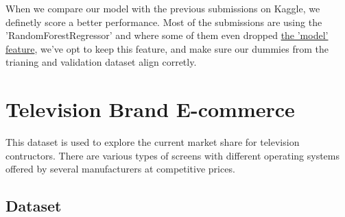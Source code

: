\newcommand{\linkUsedCarCompareSelinsong}{https://www.kaggle.com/selinsong/u-car-rf-r2-score-0-94/data}
\newcommand{\linkUsedCarCompareYuyuyuyuy}{https://www.kaggle.com/yuyuyuyuy/rf-test-r2-score-0-956}
\newcommand{\linkUsedCarCompareJohyunkang}{https://www.kaggle.com/johyunkang/py-rf-test-r2-0-939}

When we compare our model with the previous submissions on Kaggle, we definetly score a better performance. Most of the submissions are using the 'RandomForestRegressor' and where some of them even dropped \href{\linkUsedCarAkarshsinghh}{the 'model' feature}, we've opt to keep this feature, and make sure our dummies from the trianing and validation dataset align corretly.


\section{Television Brand E-commerce}
This dataset is used to explore the current market share for television contructors. There are various types of screens with different operating systems offered by several manufacturers at competitive prices.

\subsection{Dataset}
\newcommand{\kagglelinktv}{https://www.kaggle.com/devsubhash/television-brands-ecommerce-dataset}

